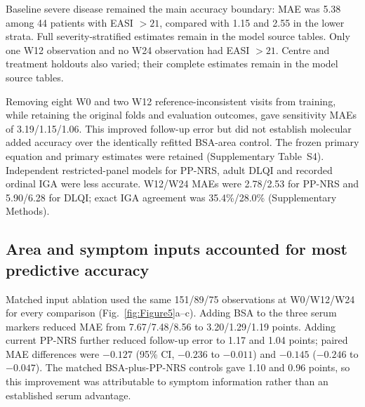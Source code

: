 \documentclass[10pt,a4paper]{article}
\begin{document}
\begin{samepage}
Baseline severe disease remained the main accuracy boundary: MAE was 5.38 among 44 patients with EASI $>21$, compared with 1.15 and 2.55 in the lower strata. Full severity-stratified estimates remain in the model source tables. Only one W12 observation and no W24 observation had EASI $>21$. Centre and treatment holdouts also varied; their complete estimates remain in the model source tables.\par
\end{samepage}

Removing eight W0 and two W12 reference-inconsistent visits from training, while retaining the original folds and evaluation outcomes, gave sensitivity MAEs of 3.19/1.15/1.06. This improved follow-up error but did not establish molecular added accuracy over the identically refitted BSA-area control. The frozen primary equation and primary estimates were retained (Supplementary Table~S4). Independent restricted-panel models for PP-NRS, adult DLQI and recorded ordinal IGA were less accurate. W12/W24 MAEs were 2.78/2.53 for PP-NRS and 5.90/6.28 for DLQI; exact IGA agreement was 35.4\%/28.0\% (Supplementary Methods).

\subsection{Area and symptom inputs accounted for most predictive accuracy}
Matched input ablation used the same 151/89/75 observations at W0/W12/W24 for every comparison (Fig.~\ref{fig:Figure5}a--c). Adding BSA to the three serum markers reduced MAE from 7.67/7.48/8.56 to 3.20/1.29/1.19 points. Adding current PP-NRS further reduced follow-up error to 1.17 and 1.04 points; paired MAE differences were $-0.127$ (95\% CI, $-0.236$ to $-0.011$) and $-0.145$ ($-0.246$ to $-0.047$). The matched BSA-plus-PP-NRS controls gave 1.10 and 0.96 points, so this improvement was attributable to symptom information rather than an established serum advantage.
\end{document}
